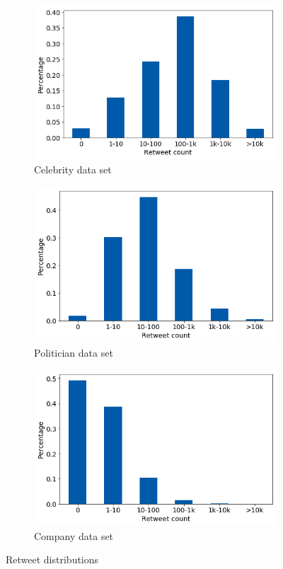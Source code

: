 \begin{figure}[h]
\centering
\begin{subfigure}{.33\textwidth}
  \centering
  \includegraphics[width=.95\linewidth]{img/celeb_retw_distr}
  \caption{Celebrity data set}
  \label{fig:retw_distr_sub1}
\end{subfigure}%
\begin{subfigure}{.33\textwidth}
  \centering
  \includegraphics[width=.95\linewidth]{img/polit_retw_distr}
  \caption{Politician data set}
  \label{fig:retw_distr_sub2}
\end{subfigure}
\begin{subfigure}{.33\textwidth}
  \centering
  \includegraphics[width=.95\linewidth]{img/corp_retw_distr}
  \caption{Company data set}
  \label{fig:retw_distr_sub3}
\end{subfigure}%
\caption{Retweet distributions}
\label{fig:retw_distr}
\end{figure}

